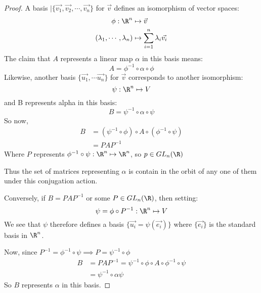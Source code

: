 \documentclass[../Main.tex]{subfiles}
\begin{document}
\begin{proof}
    A basis $|\{\vec{v_1}, \vec{v_2}, \cdots, \vec{v_n}\}$ for $\vec{v}$ defines an isomorphism of vector spaces:
    \begin{align*}
        \phi : \R^n &\mapsto \vec{v} \\
        (\lambda_1, \cdots, \lambda_n) &\mapsto \sum_{i=1}^{n} \lambda_i \vec{v_i}
    \end{align*}
    The claim that $A$ represents a linear map $\alpha$ in this basis means:
    \begin{equation*}
        A = \phi^{-1} \circ \alpha \circ \phi
    \end{equation*}
    Likewise, another basis $\{\vec{u_1}, \cdots \vec{u_n}\}$ for $\vec{v}$ corresponds to another isomorphism:
    \begin{equation*}
        \psi : \R^n \mapsto V
    \end{equation*}
    and B represents alpha in this basis:
    \begin{equation*}
        B = \psi^{-1} \circ \alpha \circ \psi
    \end{equation*}
    So now,
    \begin{align*}
        B &= (\psi^{-1} \circ \phi) \circ A \circ (\phi^{-1} \circ \psi) \\
        &= PAP^{-1}
    \end{align*}
    Where $P$ represents $\phi^{-1} \circ \psi : \R^n \mapsto \R^n$, so $p \in GL_n(\R)$\par
    Thus the set of matrices representing $\alpha$ is contain in the orbit of any one of them under this conjugation action.\par
    Conversely, if $B = PAP^{-1}$ or some $P \in GL_n(\R)$, then setting:
    \begin{equation*}
        \psi = \phi \circ P^{-1} : \R^n \mapsto V
    \end{equation*}
    We see that $\psi$ therefore defines a basis $\{\vec{u_i} = \psi(\vec{e_i})\}$ where $\{\vec{e_i}\}$ is the standard basis in $\R^n$.\par
    Now, since $P^{-1} = \phi^{-1} \circ \psi \implies P = \psi^{-1} \circ \phi$
    \begin{align*}
        B &= PAP^{-1} = \psi^{-1} \circ \phi \circ A \circ \phi^{-1} \circ \psi \\
        &= \psi^{-1} \circ \alpha \psi
    \end{align*}
    So $B$ represents $\alpha$ in this basis.
\end{proof}
\end{document}
